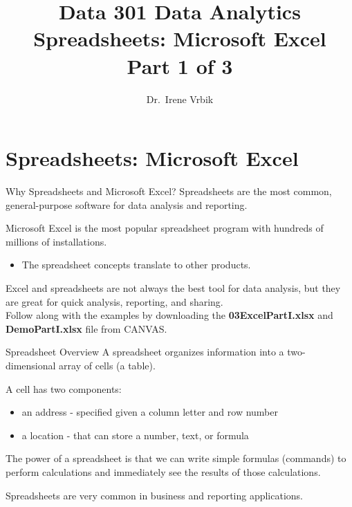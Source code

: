 \documentclass[xcolor=svgnames]{beamer}
\title
  [Data 301 Data Analytics\hspace{2em}]
  {Data 301 Data Analytics\\
  Spreadsheets: Microsoft Excel\\
  Part 1 of 3}
\author
  [Dr.\ Irene Vrbik]
  {Dr.\ Irene Vrbik}
\date
  {}
\institute
  {University of British Columbia Okanagan \newline irene.vrbik@ubc.ca}
\begin{document}
\graphicspath{{img/}}


\maketitle



\section
  {Spreadsheets: Microsoft Excel}



\begin{frame}
  {Why Spreadsheets and Microsoft Excel?}
\emph{}Spreadsheets are the most common, general-purpose software for data analysis and reporting.\par \vspace{5mm} 
Microsoft Excel is the most popular spreadsheet program with hundreds of millions of installations. 
  \begin{itemize}
\item The spreadsheet concepts translate to other products.\\[4mm]
\end{itemize}
Excel and spreadsheets are not always the best tool for data analysis, but they are great for quick analysis, reporting, and sharing.\\
\medskip
Follow along with the examples by  downloading the {\bf 03ExcelPartI.xlsx} and {\bf DemoPartI.xlsx} file from CANVAS.
\end{frame}

\begin{frame}{Spreadsheet Overview}
A spreadsheet organizes information into a two-dimensional array of cells (a table).\par \vspace{5mm} 
A cell has two components: 
\begin{itemize}
\item an address - specified given a column letter and row number 
\item a location - that can store a number, text, or formula \\[4mm]
\end{itemize}
The power of a spreadsheet is that we can write simple formulas (commands) to perform calculations and immediately see the results of those calculations.\par \vspace{5mm} 
Spreadsheets are very common in business and reporting applications.
\end{frame}
\end{document}
